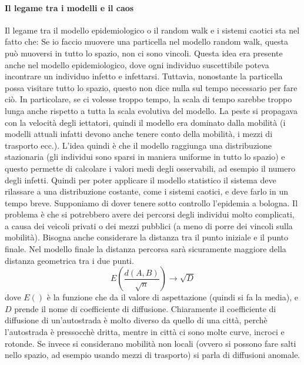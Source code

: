 \documentclass[12pt]{article}
\begin{document}
\paragraph{Il legame tra i modelli e il caos \\}
Il legame tra il modello epidemiologico o il random walk e i sistemi caotici sta nel fatto che: Se io faccio muovere una particella nel modello random walk, questa può muoversi in tutto lo spazio, non ci sono vincoli. Questa idea era presente anche nel modello epidemiologico, dove ogni individuo suscettibile poteva incontrare un individuo infetto e infettarsi. Tuttavia, nonostante la particella possa visitare tutto lo spazio, questo non dice nulla sul tempo necessario per fare ciò. In particolare, se ci volesse troppo tempo, la scala di tempo sarebbe troppo lunga anche rispetto a tutta la scala evolutiva del modello. La peste si propagava con la velocità degli iettatori, quindi il modello era dominato dalla mobilità (i modelli attuali infatti devono anche tenere conto della mobilità, i mezzi di trasporto ecc.). L'idea quindi è che il modello raggiunga una distribuzione stazionaria (gli individui sono sparsi in maniera uniforme in tutto lo spazio) e questo permette di calcolare i valori medi degli osservabili, ad esempio il numero degli infetti. Quindi per poter applicare il modello statistico il sistema deve rilassare a una distribuzione costante, come i sistemi caotici, e deve farlo in un tempo breve. Supponiamo di dover tenere sotto controllo l'epidemia a bologna. Il problema è che si potrebbero avere dei percorsi degli individui molto complicati, a causa dei veicoli privati o dei mezzi pubblici (a meno di porre dei vincoli sulla mobilità). Bisogna anche considerare la distanza tra il punto iniziale e il punto finale. Nel modello finale la distanza percorsa sarà sicuramente maggiore della distanza geometrica tra i due punti. 
$$
	E\left(\frac{d(A,B)}{\sqrt{n}}\right) \longrightarrow \sqrt{D}
$$ 
dove $E()$ è la funzione che da il valore di aspettazione (quindi si fa la media), e $D$ prende il nome di coefficiente di diffusione. Chiaramente il coefficiente di diffusione di un'autostrada è molto diverso da quello di una città, perchè l'autostrada è pressocchè dritta, mentre in città ci sono molte curve, incroci e rotonde. Se invece si considerano mobilità non locali (ovvero si possono fare salti nello spazio, ad esempio usando mezzi di trasporto) si parla di diffusioni anomale. 
\end{document}
